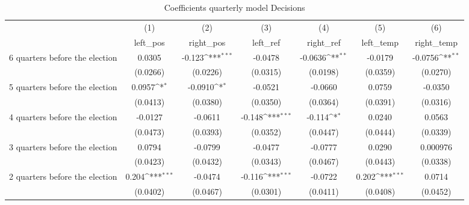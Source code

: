 \begin{table}[htbp]\centering
\def\sym#1{\ifmmode^{#1}\else\(^{#1}\)\fi}
\caption{Coefficients quarterly model Decisions}
\begin{tabular}{l*{6}{c}}
\hline\hline
                    &\multicolumn{1}{c}{(1)}&\multicolumn{1}{c}{(2)}&\multicolumn{1}{c}{(3)}&\multicolumn{1}{c}{(4)}&\multicolumn{1}{c}{(5)}&\multicolumn{1}{c}{(6)}\\
                    &\multicolumn{1}{c}{left\_pos}&\multicolumn{1}{c}{right\_pos}&\multicolumn{1}{c}{left\_ref}&\multicolumn{1}{c}{right\_ref}&\multicolumn{1}{c}{left\_temp}&\multicolumn{1}{c}{right\_temp}\\
\hline
 6 quarters before the election&      0.0305         &      -0.123\sym{***}&     -0.0478         &     -0.0636\sym{**} &     -0.0179         &     -0.0756\sym{**} \\
                    &    (0.0266)         &    (0.0226)         &    (0.0315)         &    (0.0198)         &    (0.0359)         &    (0.0270)         \\
[1em]
 5 quarters before the election&      0.0957\sym{*}  &     -0.0910\sym{*}  &     -0.0521         &     -0.0660         &      0.0759         &     -0.0350         \\
                    &    (0.0413)         &    (0.0380)         &    (0.0350)         &    (0.0364)         &    (0.0391)         &    (0.0316)         \\
[1em]
 4 quarters before the election&     -0.0127         &     -0.0611         &      -0.148\sym{***}&      -0.114\sym{*}  &      0.0240         &      0.0563         \\
                    &    (0.0473)         &    (0.0393)         &    (0.0352)         &    (0.0447)         &    (0.0444)         &    (0.0339)         \\
[1em]
 3 quarters before the election&      0.0794         &     -0.0799         &     -0.0477         &     -0.0777         &      0.0290         &    0.000976         \\
                    &    (0.0423)         &    (0.0432)         &    (0.0343)         &    (0.0467)         &    (0.0443)         &    (0.0338)         \\
[1em]
 2 quarters before the election&       0.204\sym{***}&     -0.0474         &      -0.116\sym{***}&     -0.0722         &       0.202\sym{***}&      0.0714         \\
                    &    (0.0402)         &    (0.0467)         &    (0.0301)         &    (0.0411)         &    (0.0408)         &    (0.0452)         \\

\end{tabular}
\end{table}
